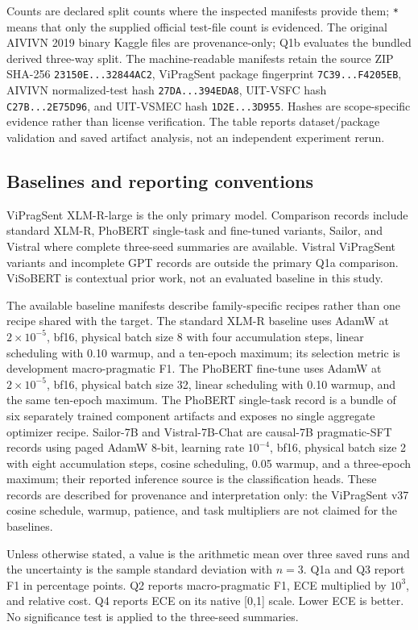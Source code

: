 Counts are declared split counts where the inspected manifests provide them; \texttt{*} means that only the supplied official test-file count is evidenced. The original AIVIVN 2019 binary Kaggle files are provenance-only; Q1b evaluates the bundled derived three-way split. The machine-readable manifests retain the source ZIP SHA-256 \texttt{23150E...32844AC2}, ViPragSent package fingerprint \texttt{7C39...F4205EB}, AIVIVN normalized-test hash \texttt{27DA...394EDA8}, UIT-VSFC hash \texttt{C27B...2E75D96}, and UIT-VSMEC hash \texttt{1D2E...3D955}. Hashes are scope-specific evidence rather than license verification. The table reports dataset/package validation and saved artifact analysis, not an independent experiment rerun.

\subsection{Baselines and reporting conventions}
ViPragSent XLM-R-large is the only primary model. Comparison records include standard XLM-R, PhoBERT single-task and fine-tuned variants, Sailor, and Vistral where complete three-seed summaries are available. Vistral ViPragSent variants and incomplete GPT records are outside the primary Q1a comparison. ViSoBERT is contextual prior work, not an evaluated baseline in this study.

The available baseline manifests describe family-specific recipes rather than one recipe shared with the target. The standard XLM-R baseline uses AdamW at $2\times10^{-5}$, bf16, physical batch size 8 with four accumulation steps, linear scheduling with 0.10 warmup, and a ten-epoch maximum; its selection metric is development macro-pragmatic F1. The PhoBERT fine-tune uses AdamW at $2\times10^{-5}$, bf16, physical batch size 32, linear scheduling with 0.10 warmup, and the same ten-epoch maximum. The PhoBERT single-task record is a bundle of six separately trained component artifacts and exposes no single aggregate optimizer recipe. Sailor-7B and Vistral-7B-Chat are causal-7B pragmatic-SFT records \citep{dou-etal-2024-sailor,nguyen-etal-2023-vistral} using paged AdamW 8-bit, learning rate $10^{-4}$, bf16, physical batch size 2 with eight accumulation steps, cosine scheduling, 0.05 warmup, and a three-epoch maximum; their reported inference source is the classification heads. These records are described for provenance and interpretation only: the ViPragSent v37 cosine schedule, warmup, patience, and task multipliers are not claimed for the baselines.

Unless otherwise stated, a value is the arithmetic mean over three saved runs and the uncertainty is the sample standard deviation with $n=3$. Q1a and Q3 report F1 in percentage points. Q2 reports macro-pragmatic F1, ECE multiplied by $10^3$, and relative cost. Q4 reports ECE on its native [0,1] scale. Lower ECE is better. No significance test is applied to the three-seed summaries.
